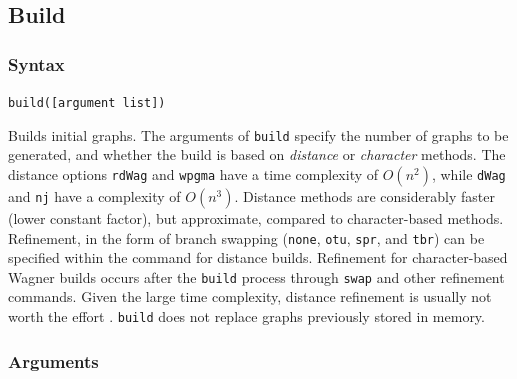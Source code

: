 \subsection{Build}
	\subsubsection{Syntax}
		\texttt{build([argument list])}
	
	\begin{phygdescription}
	
		{Builds initial graphs. The arguments of \texttt{build} specify the number of graphs 
		to be generated, and whether the build is based on \textit{distance} or \textit{character} 
		methods. The distance options \texttt{rdWag} and \texttt{wpgma} have a time complexity 
		of $O(n^2)$, while \texttt{dWag} and \texttt{nj} have a complexity of $O(n^3)$. Distance 
		methods are considerably faster (lower constant factor), but approximate, compared to 
		character-based methods. Refinement, in the form of branch swapping (\texttt{none}, 
		\texttt{otu}, \texttt{spr}, and \texttt{tbr}) can be specified within the command for distance 
		builds. Refinement for character-based Wagner builds occurs after the \texttt{build} 
		process through \texttt{swap} and other refinement commands. Given the large time 
		complexity, distance refinement is usually not worth the effort \citep{Wheeler2021}. 
		\texttt{build} does not replace graphs previously 
		stored in memory.}
		
	\end{phygdescription}
		
	\subsubsection{Arguments}

